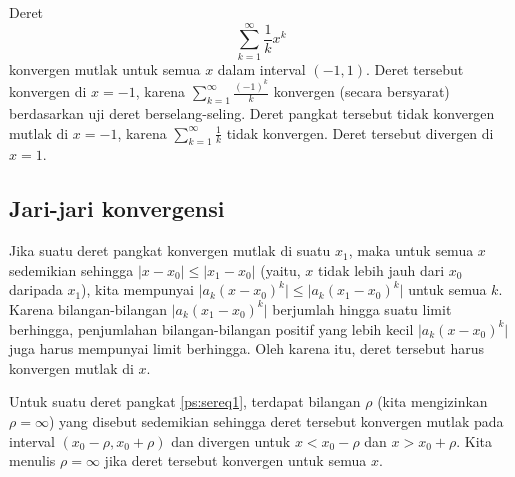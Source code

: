 \begin{example} \label{ps:1kex}
Deret
\begin{equation*}
\sum_{k=1}^\infty \frac{1}{k} x^k
\end{equation*}
konvergen mutlak untuk semua $x$ dalam interval $(-1,1)$.
Deret tersebut konvergen di $x=-1$,
karena
$\sum_{k=1}^\infty \frac{{(-1)}^k}{k}$ konvergen (secara bersyarat)
berdasarkan uji deret
berselang-seling.
Deret pangkat tersebut tidak konvergen mutlak di $x=-1$, karena
$\sum_{k=1}^\infty \frac{1}{k}$ tidak konvergen.
Deret tersebut
divergen di $x=1$.
\end{example}

\subsection{Jari-jari konvergensi}

Jika suatu deret pangkat konvergen mutlak
di suatu $x_1$, maka untuk semua $x$ sedemikian sehingga
$\lvert x - x_0  \rvert \leq \lvert x_1 - x_0 \rvert$ (yaitu, $x$ tidak
lebih jauh dari $x_0$ daripada $x_1$), kita mempunyai
$\lvert a_k {(x-x_0)}^k \rvert \leq
\lvert a_k {(x_1-x_0)}^k \rvert$
untuk semua $k$.
Karena bilangan-bilangan $\lvert a_k {(x_1-x_0)}^k \rvert$ berjumlah hingga suatu
limit berhingga, penjumlahan bilangan-bilangan positif yang lebih kecil
$\lvert a_k {(x-x_0)}^k \rvert$ juga harus mempunyai limit berhingga.
Oleh karena itu, deret tersebut harus konvergen
mutlak di $x$. %

\begin{theorem}
Untuk suatu deret pangkat \eqref{ps:sereq1}, terdapat bilangan
$\rho$ (kita mengizinkan $\rho=\infty$)
yang disebut \emph{} sedemikian sehingga
deret tersebut konvergen mutlak pada interval
$(x_0-\rho,x_0+\rho)$ dan divergen untuk $x < x_0-\rho$ dan $x > x_0+\rho$.
Kita menulis $\rho=\infty$ jika
deret tersebut konvergen untuk semua $x$.
\end{theorem}

\begin{myfig}
\capstart
{}
\caption{Konvergensi suatu deret pangkat.\label{ps:convfig}}
\end{myfig}

